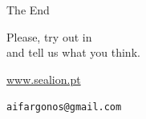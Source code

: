 \documentclass{beamer}
\begin{document}
\begin{frame}{The End}

	\begin{center}

		\vspace{5pt}

		Please, try out  in \\
		and tell us what you think.

		\vspace{5pt}

		\url{www.sealion.pt}\\

		\vspace{5pt}

		\texttt{aifargonos@gmail.com}
	\end{center}
%
%
%
%
%
%
%

\end{frame}
\end{document}
